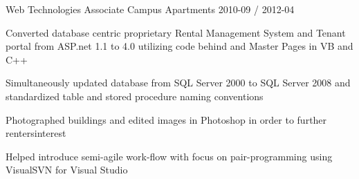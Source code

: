 \documentclass[11pt, a4paper]{awesomecv}
\begin{document}
\begin{cventries}
  \cventry
    {Web Technologies Associate}
    {Campus Apartments}
    {}
    {2010-09 / 2012-04}
    {
          \begin{cvitems}
                    \item{Converted database centric proprietary Rental Management System and Tenant portal from ASP.net 1.1 to 4.0 utilizing code behind and Master Pages in VB and C++}
                    \item{Simultaneously updated database from SQL Server 2000 to SQL Server 2008 and standardized table and stored procedure naming conventions}
                    \item{Photographed buildings and edited images in Photoshop in order to further renters\textquotesingle interest}
                    \item{Helped introduce semi-agile work-flow with focus on pair-programming using VisualSVN for Visual Studio}
          \end{cvitems}
    }
 

\end{cventries}
\end{document}
